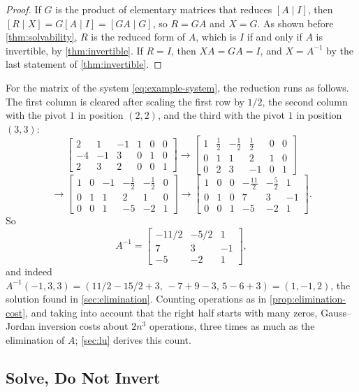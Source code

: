 \begin{proof}
If $G$ is the product of elementary matrices that reduces $[A\mid I]$, then $[R\mid X]=G[A\mid I]=[GA\mid G]$, so $R=GA$ and $X=G$. As shown before \cref{thm:solvability}, $R$ is the reduced form of $A$, which is $I$ if and only if $A$ is invertible, by \cref{thm:invertible}. If $R=I$, then $XA=GA=I$, and $X=A^{-1}$ by the last statement of \cref{thm:invertible}.
\end{proof}

For the matrix of the system \eqref{eq:example-system}, the reduction runs as follows. The first column is cleared after scaling the first row by $1/2$, the second column with the pivot $1$ in position $(2,2)$, and the third with the pivot $1$ in position $(3,3)$:
\[
\left[\begin{array}{rrr|rrr}2&1&-1&1&0&0\\-4&-1&3&0&1&0\\2&3&2&0&0&1\end{array}\right]
\longrightarrow
\left[\begin{array}{rrr|rrr}1&\frac12&-\frac12&\frac12&0&0\\0&1&1&2&1&0\\0&2&3&-1&0&1\end{array}\right]
\]
\[
\longrightarrow
\left[\begin{array}{rrr|rrr}1&0&-1&-\frac12&-\frac12&0\\0&1&1&2&1&0\\0&0&1&-5&-2&1\end{array}\right]
\longrightarrow
\left[\begin{array}{rrr|rrr}1&0&0&-\frac{11}2&-\frac52&1\\0&1&0&7&3&-1\\0&0&1&-5&-2&1\end{array}\right].
\]
So
\[
A^{-1}=\begin{bmatrix}-11/2&-5/2&1\\7&3&-1\\-5&-2&1\end{bmatrix},
\]
and indeed $A^{-1}(-1,3,3)=(11/2-15/2+3,\,-7+9-3,\,5-6+3)=(1,-1,2)$, the solution found in \cref{sec:elimination}. Counting operations as in \cref{prop:elimination-cost}, and taking into account that the right half starts with many zeros, Gauss--Jordan inversion costs about $2n^3$ operations, three times as much as the elimination of $A$; \cref{sec:lu} derives this count.

\subsection{Solve, Do Not Invert}

